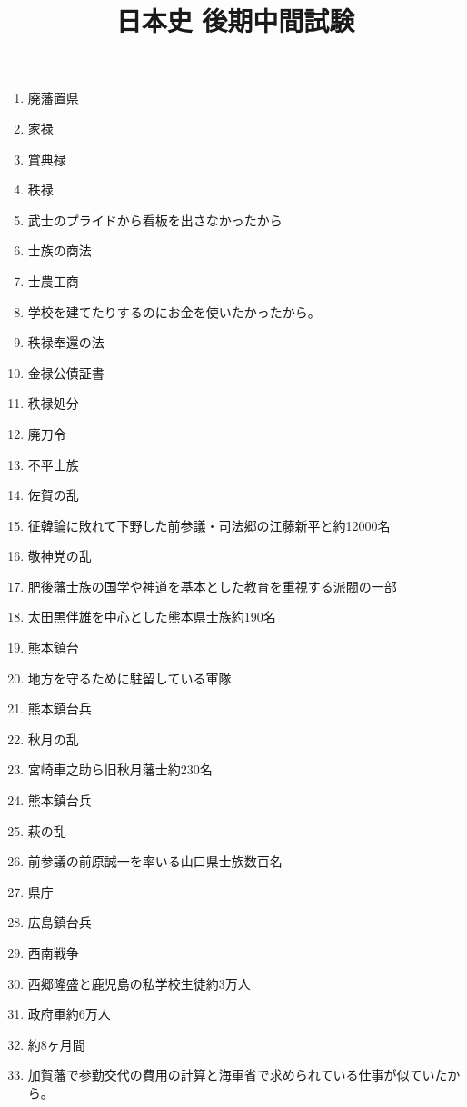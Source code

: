 \documentclass[]{jsarticle}
\begin{document}
\title{日本史 後期中間試験}
\author{}
\date{}

\maketitle

\renewcommand{\labelenumi}{(\arabic{enumi})}

\begin{enumerate}
	\item 廃藩置県
	\item 家禄
	\item 賞典禄
	\item 秩禄
	\item 武士のプライドから看板を出さなかったから
		\\
	\item 士族の商法
	\item 士農工商
	\item 学校を建てたりするのにお金を使いたかったから。
	\item 秩禄奉還の法
	\item 金禄公債証書
	\item 秩禄処分
	\item 廃刀令
	\item 不平士族
	\item 佐賀の乱
	\item 征韓論に敗れて下野した前参議・司法郷の江藤新平と約12000名
	\item 敬神党の乱
	\item 肥後藩士族の国学や神道を基本とした教育を重視する派閥の一部
	\item 太田黒伴雄を中心とした熊本県士族約190名
	\item 熊本鎮台
	\item 地方を守るために駐留している軍隊
	\item 熊本鎮台兵
	\item 秋月の乱
	\item 宮崎車之助ら旧秋月藩士約230名
	\item 熊本鎮台兵
	\item 萩の乱
	\item 前参議の前原誠一を率いる山口県士族数百名
	\item 県庁
	\item 広島鎮台兵
	\item 西南戦争
	\item 西郷隆盛と鹿児島の私学校生徒約3万人
	\item 政府軍約6万人
	\item 約8ヶ月間
	\item 加賀藩で参勤交代の費用の計算と海軍省で求められている仕事が似ていたから。

\end{enumerate}
\end{document}
